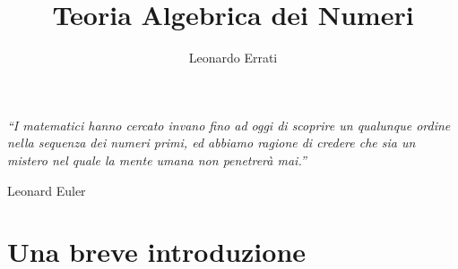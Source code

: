 \documentclass[a4paper,twoside]{book}
\begin{document}
	\frontmatter
	\title{\textbf{Teoria Algebrica dei Numeri}}
	\author{Leonardo Errati}
	\date{}
	\maketitle
	
		\epigraph{\textit{\enquote{I matematici hanno cercato invano fino ad oggi di scoprire un qualunque ordine nella sequenza dei numeri primi, ed abbiamo ragione di credere che sia un mistero nel quale la mente umana non penetrerà mai.}}}{Leonard Euler}
	
	\tableofcontents
	
	
	
	\chapter{Una breve introduzione}
\end{document}
